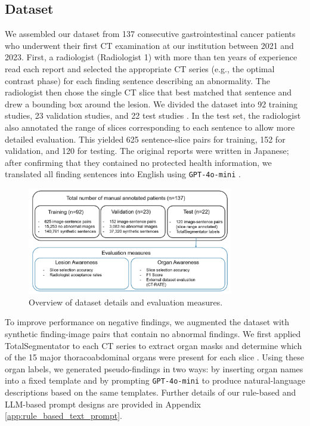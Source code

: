 \documentclass[bioengineering,article,submit,pdftex,moreauthors]{Definitions/mdpi}
\begin{document}
\subsection{Dataset}\label{sec:dataset}
We assembled our dataset from 137 consecutive gastrointestinal cancer patients who underwent their ﬁrst CT examination at our institution between 2021 and 2023. 
First, a radiologist (Radiologist 1) with more than ten years of experience read each report and selected the appropriate CT series (e.g., the optimal contrast phase) for each finding sentence describing an abnormality. 
The radiologist then chose the single CT slice that best matched that sentence and drew a bounding box around the lesion. 
We divided the dataset into 92 training studies, 23 validation studies, and 22 test studies . 
In the test set, the radiologist also annotated the range of slices corresponding to each sentence to allow more detailed evaluation. 
This yielded 625 sentence-slice pairs for training, 152 for validation, and 120 for testing. 
The original reports were written in Japanese; after confirming that they contained no protected health information, we translated all finding sentences into English using \texttt{GPT-4o-mini} \cite{openai_gpt-4_2024}. 


\begin{figure}[ht]
  \centering
  \includegraphics[width=0.8\textwidth]{./figures/dataset_detail_1.png}
  \caption{
     Overview of dataset details and evaluation measures.
  }
  \label{fig:dataset_detail}
\end{figure}


To improve performance on negative findings, we augmented the dataset with synthetic finding-image pairs that contain no abnormal findings. 
We first applied TotalSegmentator to each CT series to extract organ masks and determine which of the 15 major thoracoabdominal organs were present for each slice \cite{wasserthal_totalsegmentator_2023}. 
Using these organ labels, we generated pseudo-findings in two ways: by inserting organ names into a fixed template and by prompting \texttt{GPT-4o-mini} to produce natural-language descriptions based on the same templates. 
Further details of our rule-based and LLM-based prompt designs are provided in Appendix \ref{app:rule_based_text_prompt}.
\end{document}
